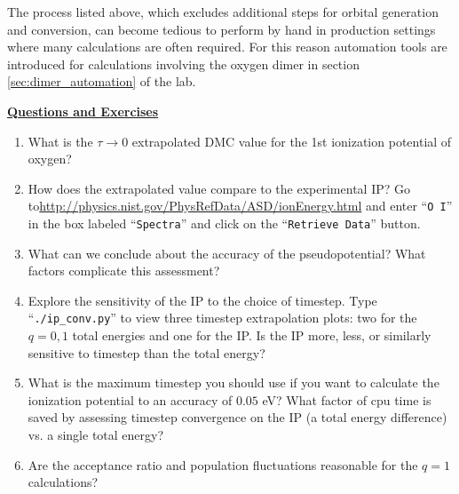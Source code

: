 The process listed above, which excludes additional steps for orbital generation and conversion, can become tedious to perform by hand in production settings where many calculations are often required.  For this reason automation tools are introduced for calculations involving the oxygen dimer in section \ref{sec:dimer_automation} of the lab.  

\vspace{1cm}
\begin{flushleft}
\textbf{\underline{Questions and Exercises}}
\end{flushleft}
\begin{enumerate}
  \item{What is the $\tau\rightarrow 0$ extrapolated DMC value for the 1st ionization potential of oxygen?}
  \item{How does the extrapolated value compare to the experimental IP?  Go to\newline \href{http://physics.nist.gov/PhysRefData/ASD/ionEnergy.html}{http://physics.nist.gov/PhysRefData/ASD/ionEnergy.html} and enter ``\texttt{O I}'' in the box labeled ``\texttt{Spectra}'' and click on the ``\texttt{Retrieve Data}'' button.  
}
  \item{What can we conclude about the accuracy of the pseudopotential?  What factors complicate this assessment?}
  \item{Explore the sensitivity of the IP to the choice of timestep.  Type ``\verb|./ip_conv.py|'' to view three timestep extrapolation plots: two for the $q=0,1$ total energies and one for the IP.  Is the IP more, less, or similarly sensitive to timestep than the total energy?}
  \item{What is the maximum timestep you should use if you want to calculate the ionization potential to an accuracy of $0.05$ eV?  What factor of cpu time is saved by assessing timestep convergence on the IP (a total energy difference) vs. a single total energy?}
  \item{Are the acceptance ratio and population fluctuations reasonable for the $q=1$ calculations?}
\end{enumerate}




